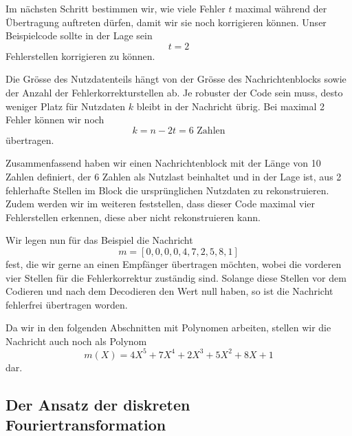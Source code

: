 Im nächsten Schritt bestimmen wir, wie viele Fehler $t$ maximal während der Übertragung auftreten dürfen, damit wir sie noch korrigieren können.
Unser Beispielcode sollte in der Lage sein
\[
t = 2
\]
Fehlerstellen korrigieren zu können.

Die Grösse des Nutzdatenteils hängt von der Grösse des Nachrichtenblocks sowie der Anzahl der Fehlerkorrekturstellen ab. Je robuster der Code sein muss, desto weniger Platz für Nutzdaten $k$ bleibt in der Nachricht übrig.
Bei maximal 2 Fehler können wir noch
\[
k = n - 2t = 6\text{ Zahlen}
\]
übertragen. 

Zusammenfassend haben wir einen Nachrichtenblock mit der Länge von 10 Zahlen definiert, der 6 Zahlen als Nutzlast beinhaltet und in der Lage ist, aus 2 fehlerhafte Stellen im Block die ursprünglichen Nutzdaten zu rekonstruieren. Zudem werden wir im weiteren feststellen, dass dieser Code maximal vier Fehlerstellen erkennen, diese aber nicht rekonstruieren kann.

Wir legen nun für das Beispiel die Nachricht
\[
m = [0,0,0,0,4,7,2,5,8,1]
\]
fest, die wir gerne an einen Empfänger übertragen möchten, wobei die vorderen vier Stellen für die Fehlerkorrektur zuständig sind.
Solange diese Stellen vor dem Codieren und nach dem Decodieren den Wert null haben, so ist die Nachricht fehlerfrei übertragen worden.

Da wir in den folgenden Abschnitten mit Polynomen arbeiten, stellen wir die Nachricht auch noch als Polynom
\[
m(X) = 4X^5 + 7X^4 + 2X^3 + 5X^2 + 8X + 1
\] 
dar.


\subsection{Der Ansatz der diskreten Fouriertransformation
	\label{reedsolomon:subsection:diskFT}}

